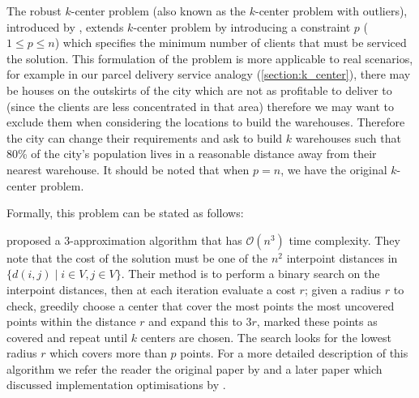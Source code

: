 The robust $k$-center problem (also known as the $k$-center problem with outliers), introduced by \textcite{charikar_algorithms_2001}, extends $k$-center problem by introducing a constraint \(p\) (\(1 \leq p \leq n \)) which specifies the minimum number of clients that must be serviced the solution. This formulation of the problem is more applicable to real scenarios, for example in our parcel delivery service analogy (\cref{section:k_center}), there may be houses on the outskirts of the city which are not as profitable to deliver to (since the clients are less concentrated in that area) therefore we may want to exclude them when considering the locations to build the warehouses. Therefore the city can change their requirements and ask to build $k$ warehouses such that 80\% of the city's population lives in a reasonable distance away from their nearest warehouse. It should be noted that when \(p=n\), we have the original $k$-center problem.

Formally, this problem can be stated as follows:


\textcite{charikar_algorithms_2001} proposed a 3-approximation algorithm that has $\mathcal{O}(n^{3})$ time complexity. They note that the cost of the solution must be one of the $n^{2}$ interpoint distances in $\{d(i,j)\mid i\in V, j\in V\}$. Their method is to perform a binary search on the interpoint distances, then at each iteration evaluate a cost $r$; given a radius $r$ to check, greedily choose a center that cover the most points the most uncovered points within the distance $r$ and expand this to $3r$, marked these points as covered and repeat until $k$ centers are chosen. The search looks for the lowest radius $r$ which covers more than $p$ points. For a more detailed description of this algorithm we refer the reader the original paper by \textcite{charikar_algorithms_2001} and a later paper which discussed implementation optimisations by \textcite{schwartz_efficient_2010}.